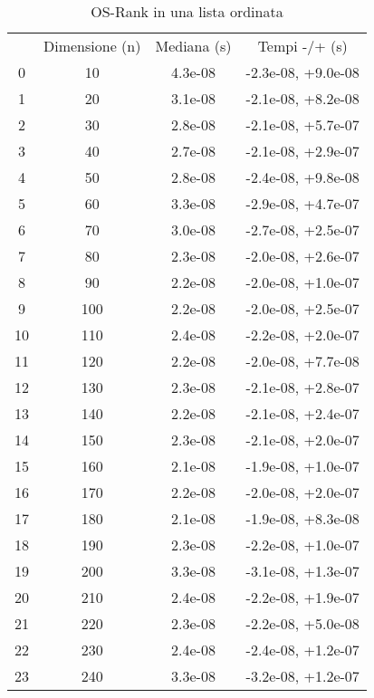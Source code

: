\begin{table}
\centering
\caption{OS-Rank in una lista ordinata}
\label{OS-Rank in una lista ordinata}
\begin{adjustbox}{width=1\textwidth/2}
\begin{tabular}{|c|c|c|c|}
\hline
 & Dimensione (n) & Mediana (s) & Tempi -/+ (s) \\
0 & 10 & 4.3e-08 & -2.3e-08, +9.0e-08 \\
\cline{1-4}
1 & 20 & 3.1e-08 & -2.1e-08, +8.2e-08 \\
\cline{1-4}
2 & 30 & 2.8e-08 & -2.1e-08, +5.7e-07 \\
\cline{1-4}
3 & 40 & 2.7e-08 & -2.1e-08, +2.9e-07 \\
\cline{1-4}
4 & 50 & 2.8e-08 & -2.4e-08, +9.8e-08 \\
\cline{1-4}
5 & 60 & 3.3e-08 & -2.9e-08, +4.7e-07 \\
\cline{1-4}
6 & 70 & 3.0e-08 & -2.7e-08, +2.5e-07 \\
\cline{1-4}
7 & 80 & 2.3e-08 & -2.0e-08, +2.6e-07 \\
\cline{1-4}
8 & 90 & 2.2e-08 & -2.0e-08, +1.0e-07 \\
\cline{1-4}
9 & 100 & 2.2e-08 & -2.0e-08, +2.5e-07 \\
\cline{1-4}
10 & 110 & 2.4e-08 & -2.2e-08, +2.0e-07 \\
\cline{1-4}
11 & 120 & 2.2e-08 & -2.0e-08, +7.7e-08 \\
\cline{1-4}
12 & 130 & 2.3e-08 & -2.1e-08, +2.8e-07 \\
\cline{1-4}
13 & 140 & 2.2e-08 & -2.1e-08, +2.4e-07 \\
\cline{1-4}
14 & 150 & 2.3e-08 & -2.1e-08, +2.0e-07 \\
\cline{1-4}
15 & 160 & 2.1e-08 & -1.9e-08, +1.0e-07 \\
\cline{1-4}
16 & 170 & 2.2e-08 & -2.0e-08, +2.0e-07 \\
\cline{1-4}
17 & 180 & 2.1e-08 & -1.9e-08, +8.3e-08 \\
\cline{1-4}
18 & 190 & 2.3e-08 & -2.2e-08, +1.0e-07 \\
\cline{1-4}
19 & 200 & 3.3e-08 & -3.1e-08, +1.3e-07 \\
\cline{1-4}
20 & 210 & 2.4e-08 & -2.2e-08, +1.9e-07 \\
\cline{1-4}
21 & 220 & 2.3e-08 & -2.2e-08, +5.0e-08 \\
\cline{1-4}
22 & 230 & 2.4e-08 & -2.4e-08, +1.2e-07 \\
\cline{1-4}
23 & 240 & 3.3e-08 & -3.2e-08, +1.2e-07 \\

\end{tabular}
\end{adjustbox}
\end{table}

